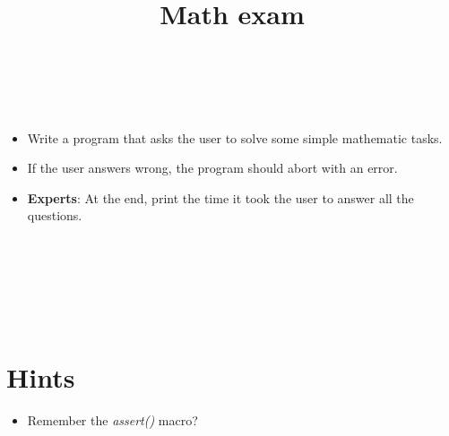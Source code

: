 


\title{Math exam} %
\author{} %
\renewcommand{\difficulty}{Hard} %
\renewcommand{\requirements}{Standard library} %
\renewcommand{\aims}{Learn to work with the standard library} %


 \maketitle
 \taskinfos

\ \\\ \\
\begin{itemize}
	\item Write a program that asks the user to solve some simple mathematic tasks.
	\item If the user answers wrong, the program should abort with an error.
	\item \textbf{Experts}: At the end, print the time it took the user to answer all the questions.
\end{itemize}	
 
 
\ \\\ \\\ \\\ \\\ \\
\section*{Hints}
	\begin{itemize}
		\item Remember the \textit{assert()} macro?
	\end{itemize}
 

